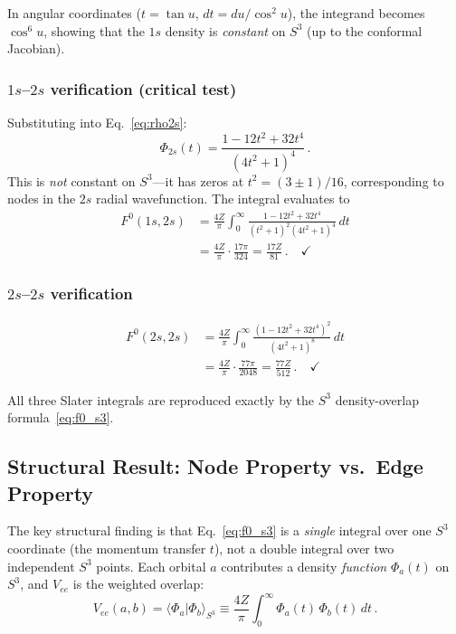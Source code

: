 \documentclass[aps,pra,twocolumn,superscriptaddress,longbibliography]{revtex4-2}
\begin{document}
In angular coordinates ($t = \tan u$, $dt = du/\cos^2 u$),
the integrand becomes $\cos^6 u$, showing that the $1s$ density
is \emph{constant} on $S^3$ (up to the conformal Jacobian).

\subsubsection{$1s$--$2s$ verification (critical test)}

Substituting into Eq.~\eqref{eq:rho2s}:
\begin{equation}
  \Phi_{2s}(t) = \frac{1 - 12t^2 + 32t^4}{(4t^2 + 1)^4} \,.
  \label{eq:phi2s}
\end{equation}
This is \emph{not} constant on $S^3$---it has zeros at
$t^2 = (3 \pm 1)/16$, corresponding to nodes in the $2s$ radial
wavefunction. The integral evaluates to
\begin{align}
  F^0(1s,2s) &= \frac{4Z}{\pi} \int_0^\infty
  \frac{1 - 12t^2 + 32t^4}{(t^2+1)^2 (4t^2+1)^4} \, dt \nonumber\\
  &= \frac{4Z}{\pi} \cdot \frac{17\pi}{324}
  = \frac{17Z}{81} \,. \quad\checkmark
\end{align}

\subsubsection{$2s$--$2s$ verification}

\begin{align}
  F^0(2s,2s) &= \frac{4Z}{\pi} \int_0^\infty
  \frac{(1 - 12t^2 + 32t^4)^2}{(4t^2+1)^8} \, dt \nonumber\\
  &= \frac{4Z}{\pi} \cdot \frac{77\pi}{2048}
  = \frac{77Z}{512} \,. \quad\checkmark
\end{align}

All three Slater integrals are reproduced exactly by the $S^3$
density-overlap formula~\eqref{eq:f0_s3}.

\subsection{Structural Result: Node Property vs.\ Edge Property}
\label{sec:node_vs_edge}

The key structural finding is that
Eq.~\eqref{eq:f0_s3} is a \emph{single} integral over one $S^3$
coordinate (the momentum transfer $t$), not a double integral over
two independent $S^3$ points. Each orbital $a$ contributes a density
\emph{function} $\Phi_a(t)$ on $S^3$, and $V_{ee}$ is the weighted
overlap:
\begin{equation}
  V_{ee}(a,b) = \langle \Phi_a | \Phi_b \rangle_{S^3}
  \equiv \frac{4Z}{\pi} \int_0^\infty \Phi_a(t) \, \Phi_b(t) \, dt \,.
\end{equation}
\end{document}
